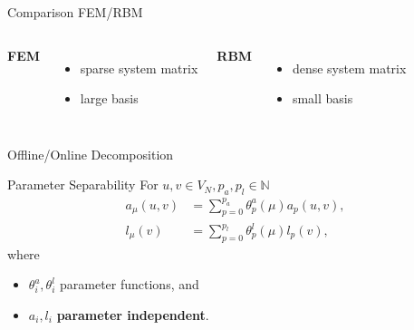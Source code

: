 \begin{frame}{Comparison FEM/RBM}
    \begin{columns}
            \textbf{FEM} \\
            \begin{itemize}
                \item sparse system matrix
                \item large basis
            \end{itemize}
            \textbf{RBM} \\
            \begin{itemize}
                \item dense system matrix
                \item small basis
            \end{itemize}
    \end{columns}
\end{frame}

\begin{frame}{Offline/Online Decomposition}
    \begin{block}{Parameter Separability}
        For $u, v \in V_N, p_a, p_l \in \mathbb{N}$
        \begin{align*}
            a_\mu(u, v) &= \sum\limits_{p = 0}^{p_a} \theta_p^a(\mu) a_p(u, v), \\
            l_\mu(v) &= \sum\limits_{p = 0}^{p_l} \theta_p^l(\mu) l_p(v),
        \end{align*}
        where
        \begin{itemize}
            \item $\theta^a_i, \theta^l_i$ parameter functions, and
            \item $a_i, l_i$ \textbf{parameter independent}.
        \end{itemize}
    \end{block}
\end{frame}

